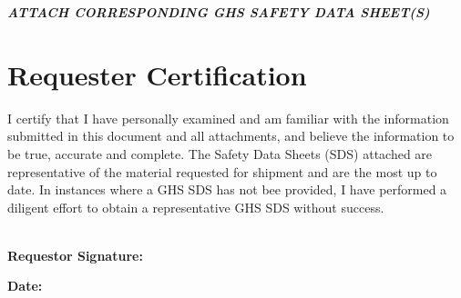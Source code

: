 \documentclass[{{ data.paper }}, 11pt]{article}
\begin{document}
\begin{center}
\textbf{\textit{ATTACH CORRESPONDING GHS SAFETY DATA SHEET(S)} }
\end{center}
\vspace{-2em}
\section*{Requester Certification}
I certify that I have personally examined and am familiar with the information submitted in this document and all attachments, and believe the information to be true, accurate and complete. The Safety Data Sheets (SDS) attached are representative of the material requested for shipment and are the most up to date. In instances where a GHS SDS has not bee provided, I have performed a diligent effort to obtain a representative GHS SDS without success.\\
\\
\begin{minipage}[t]{0.7\textwidth}
\textbf{Requestor Signature:} \hrulefill
\end{minipage}
\quad
\begin{minipage}[t]{0.3\textwidth}
\textbf{Date:}
\end{minipage}
\end{document}
